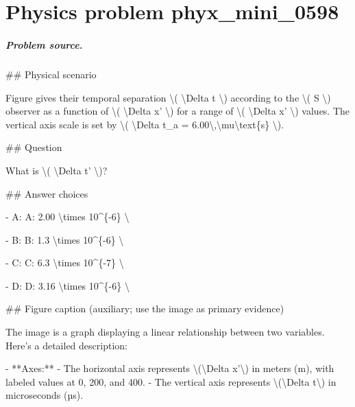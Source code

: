 
\chapter{Physics problem phyx\_mini\_0598}
\label{ch:PhyXMiniProblems_problem_phyx_mini_0598}

\paragraph{Problem source.}
\#\# Physical scenario

Figure gives their temporal separation \textbackslash{}( \textbackslash{}Delta t \textbackslash{}) according to the \textbackslash{}( S \textbackslash{}) observer as a function of \textbackslash{}( \textbackslash{}Delta x' \textbackslash{}) for a range of \textbackslash{}( \textbackslash{}Delta x' \textbackslash{}) values. The vertical axis scale is set by \textbackslash{}( \textbackslash{}Delta t\_a = 6.00\textbackslash{},\textbackslash{}mu\textbackslash{}text\{s\} \textbackslash{}).

\#\# Question

What is \textbackslash{}( \textbackslash{}Delta t' \textbackslash{})?

\#\# Answer choices

- A: A: 2.00 \textbackslash{}times 10\textasciicircum{}\{-6\} \textbackslash{}

- B: B: 1.3 \textbackslash{}times 10\textasciicircum{}\{-6\} \textbackslash{}

- C: C: 6.3 \textbackslash{}times 10\textasciicircum{}\{-7\} \textbackslash{}

- D: D: 3.16 \textbackslash{}times 10\textasciicircum{}\{-6\} \textbackslash{}

\#\# Figure caption (auxiliary; use the image as primary evidence)

The image is a graph displaying a linear relationship between two variables. Here's a detailed description:

- **Axes:**
  - The horizontal axis represents \textbackslash{}(\textbackslash{}Delta x'\textbackslash{}) in meters (m), with labeled values at 0, 200, and 400.
  - The vertical axis represents \textbackslash{}(\textbackslash{}Delta t\textbackslash{}) in microseconds (µs).

